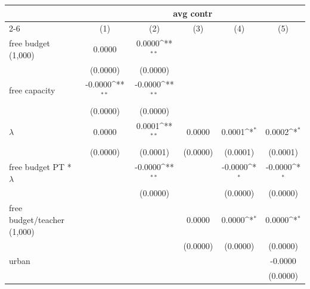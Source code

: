 {
\def\sym#1{\ifmmode^{#1}\else\(^{#1}\)\fi}
\begin{tabular}{l*{5}{c}}
\hline\hline
                    &\multicolumn{5}{c}{avg contr}                                                                                \\\cmidrule(lr){2-6}
                    &\multicolumn{1}{c}{(1)}         &\multicolumn{1}{c}{(2)}         &\multicolumn{1}{c}{(3)}         &\multicolumn{1}{c}{(4)}         &\multicolumn{1}{c}{(5)}         \\
\hline
free budget (1,000) &      0.0000         &      0.0000\sym{**} &                     &                     &                     \\
                    &    (0.0000)         &    (0.0000)         &                     &                     &                     \\
[1em]
free capacity       &     -0.0000\sym{**} &     -0.0000\sym{**} &                     &                     &                     \\
                    &    (0.0000)         &    (0.0000)         &                     &                     &                     \\
[1em]
$\lambda$           &      0.0000         &      0.0001\sym{**} &      0.0000         &      0.0001\sym{*}  &      0.0002\sym{*}  \\
                    &    (0.0000)         &    (0.0001)         &    (0.0000)         &    (0.0001)         &    (0.0001)         \\
[1em]
free budget PT * $\lambda$&                     &     -0.0000\sym{**} &                     &     -0.0000\sym{*}  &     -0.0000\sym{*}  \\
                    &                     &    (0.0000)         &                     &    (0.0000)         &    (0.0000)         \\
[1em]
free budget/teacher (1,000)&                     &                     &      0.0000         &      0.0000\sym{*}  &      0.0000\sym{*}  \\
                    &                     &                     &    (0.0000)         &    (0.0000)         &    (0.0000)         \\
[1em]
urban               &                     &                     &                     &                     &     -0.0000         \\
                    &                     &                     &                     &                     &    (0.0000)         \\

\end{tabular}}
